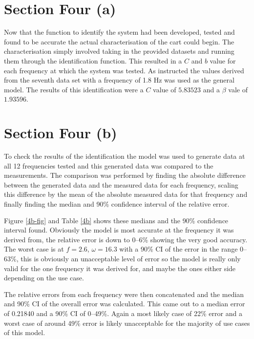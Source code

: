 \section*{Section Four (a)}

Now that the function to identify the system had been developed, tested and
found to be accurate the actual characterisation of the cart could begin.  The
characterisation simply involved taking in the provided datasets and running them
through the identification function.  This resulted in a $C$ and $b$ value for
each frequency at which the system was tested.  As instructed the values derived
from the seventh data set with a frequency of 1.8 Hz was used as the general
model.  The results of this identification were a $C$ value of $5.83523$ and a
$\beta$ vale of $1.93596$.

\section*{Section Four (b)}

To check the results of the identification the model was used to generate data
at all 12 frequencies tested and this generated data was compared to the
measurements.  The comparison was performed by finding the absolute difference
between the generated data and the measured data for each frequency, scaling
this difference by the mean of the absolute measured data for that frequency and
finally finding the median and 90\% confidence interval of the relative error.

Figure \ref{4b-fig} and Table \ref{4b} shows these medians and the 90\%
confidence interval found.  Obviously the model is most accurate at the
frequency it was derived from, the relative error is down to 0--6\% showing the
very good accuracy.  The worst case is at $f = 2.6$, $\omega = 16.3$ with a 90\% CI of the
error in the range 0--63\%, this is obviously an unacceptable level of error so
the model is really only valid for the one frequency it was derived for, and
maybe the ones either side depending on the use case.

The relative errors from each frequency were then concatenated and the median
and 90\% CI of the overall error was calculated.  This came out to a median
error of 0.21840 and a 90\% CI of 0--49\%.  Again a most likely case of 22\%
error and a worst case of around 49\% error is likely unacceptable for the
majority of use cases of this model.


